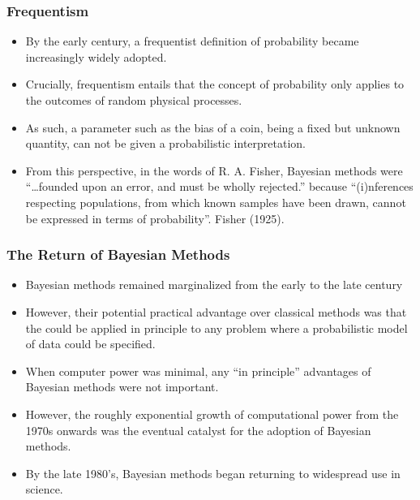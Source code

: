 \documentclass{slides}
\begin{document}
\begin{frame}
	\frametitle{Frequentism}
	\begin{itemize}

		\item By the early  century, a frequentist definition
			of probability became increasingly widely adopted.

		\item Crucially, frequentism entails that the concept of
			probability only applies to the outcomes of random
			physical processes.

\item As such, a parameter such as the bias of a coin, being a fixed but
	unknown quantity, can not be given a probabilistic interpretation.  

\item From this perspective, in the words of
R. A. Fisher, Bayesian methods were ``\ldots founded upon an error, and must be
wholly rejected.'' because
``(i)nferences respecting populations, from which known samples have been
drawn, cannot be expressed in terms of probability''. Fisher (1925).

	\end{itemize}
\end{frame}

\begin{frame}
	\frametitle{The Return of Bayesian Methods}
	
	\begin{itemize}
		\item Bayesian methods remained marginalized from the early to the late
		 century
		\item However, their potential practical advantage over
		classical methods was that the could be applied in principle to any problem
		where a probabilistic model of data could be specified.  
		\item When computer power was minimal, any ``in principle'' advantages of Bayesian
		methods were not important.
		\item However, the roughly exponential growth of
		computational power from the 1970s onwards was the eventual catalyst for the adoption of
		Bayesian methods.
		\item By the late 1980's, Bayesian methods began returning to widespread use in science.
	\end{itemize}
\end{frame}
\end{document}
